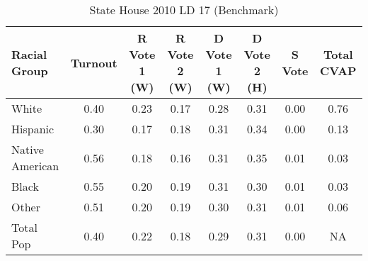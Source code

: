 \begin{table}[!h]
\begin{center}
\caption{State House 2010 LD 17 (Benchmark)}
\label{sthse10_cvap_ld_17}
\begin{tabular}{lccccccc}
  \hline
Racial Group & Turnout & R Vote 1 (W) & R Vote 2 (W) & D Vote 1 (W) & D Vote 2 (H) & S Vote & Total CVAP \\ 
  \hline
    White & 0.40  & 0.23  & 0.17  & 0.28  & 0.31  & 0.00  & 0.76 \\
    Hispanic & 0.30  & 0.17  & 0.18  & 0.31  & 0.34  & 0.00  & 0.13 \\
    Native American & 0.56  & 0.18  & 0.16  & 0.31  & 0.35  & 0.01  & 0.03 \\
    Black & 0.55  & 0.20  & 0.19  & 0.31  & 0.30  & 0.01  & 0.03 \\
    Other & 0.51  & 0.20  & 0.19  & 0.30  & 0.31  & 0.01  & 0.06 \\
    Total Pop & 0.40  & 0.22  & 0.18  & 0.29  & 0.31  & 0.00  & NA \\
    \hline
\end{tabular}
\end{center}
\end{table}
